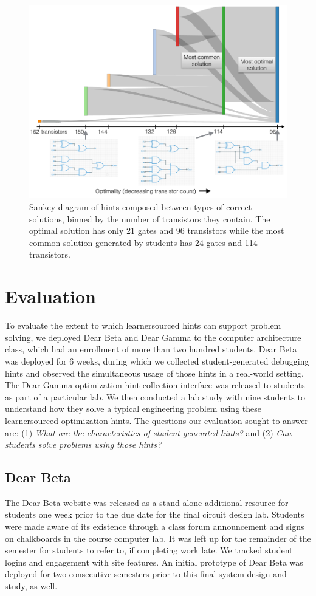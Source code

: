 \begin{figure}
\centering
\includegraphics[width=1.0\columnwidth]{Body/figures/classoverflow/annotated_Sankey_onecolumn.png}
\caption{Sankey diagram of hints composed between types of correct solutions, binned by the number of transistors they contain. The optimal solution has only 21 gates and 96 transistors while the most common solution generated by students has 24 gates and 114 transistors.}
\label{fig:sankey}
\end{figure}


\section{Evaluation}

To evaluate the extent to which learnersourced hints can support problem solving, we deployed Dear Beta and Dear Gamma to the computer architecture class, which had an enrollment of more than two hundred students. Dear Beta was deployed for 6 weeks, during which we collected student-generated debugging hints and observed the simultaneous usage of those hints in a real-world setting. The Dear Gamma optimization hint collection interface was released to students as part of a particular lab. We then conducted a lab study with nine students to understand how they solve a typical engineering problem using these learnersourced optimization hints. The questions our evaluation sought to answer are: (1) {\it What are the characteristics of student-generated hints?} and (2) {\it Can students solve problems using those hints?}

\subsection{Dear Beta}
The Dear Beta website was released as a stand-alone additional resource for students one week prior to the due date for the final circuit design lab. Students were made aware of its existence through a class forum announcement and signs on chalkboards in the course computer lab. It was left up for the remainder of the semester for students to refer to, if completing work late. We tracked student logins and engagement with site features. An initial prototype of Dear Beta was deployed for two consecutive semesters prior to this final system design and study, as well.

